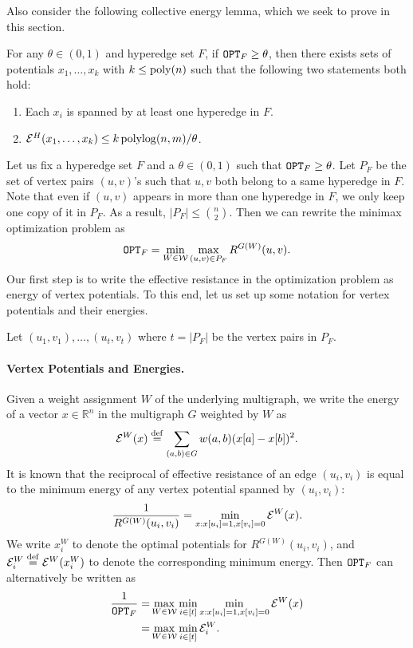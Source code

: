 \documentclass{article}
\begin{document}
Also consider the following collective energy lemma, which
we seek to prove in this section.


\begin{lemma}
    For any $\theta\in(0,1)$
    and hyperedge set $F$,
    if $\mathtt{OPT}_F \geq \theta$,
    then
    there exists sets of potentials $x_1,\ldots,x_k$
    with $k\leq\mathrm{poly}(n)$
    such that
    the following two statements both hold:
    \begin{enumerate}
        \item Each $x_i$ is spanned by at least one hyperedge in $F$.
        \item $\mathcal{E}^H(x_1,\ldots,x_k) \leq k \operatorname{polylog}(n,m) / \theta$.
    \end{enumerate}
\end{lemma}


Let us fix a hyperedge set $F$ and a $\theta\in(0,1)$ such that
$\mathtt{OPT}_F \geq \theta$.
Let $P_F$ be the set of vertex pairs $(u,v)$'s such that $u,v$ both belong to a same
hyperedge in $F$.
Note that even if $(u,v)$ appears in more than one hyperedge in $F$, we only keep one copy
of it in $P_F$. As a result, $|P_F|\leq \binom{n}{2}$.
Then we can rewrite the minimax optimization problem as
\begin{align}
    \mathtt{OPT}_F = \min_{W\in \mathcal{W}} \max_{(u,v)\in P_F} R^{G(W)}(u,v).
\end{align}
Our first step is to write the effective resistance in the optimization problem
as energy of vertex potentials.
To this end, let us set up some notation for vertex potentials and their energies.

Let $(u_1,v_1),\ldots,(u_{t},v_{t})$ where $t=|P_F|$ be the vertex pairs in $P_F$.

\paragraph{Vertex Potentials and Energies.}
Given a weight assignment $W$ of the underlying multigraph,
we write the energy of a vector $x\in\mathbb{R}^{n}$ in the multigraph
$G$ weighted by $W$ as
\begin{align}
    \mathcal{E}^W(x) \stackrel{\mathrm{def}}{=} 
    \sum_{(a,b)\in G} w(a,b) (x[a] - x[b])^2.
\end{align}
It is known that the reciprocal of effective resistance of an edge $(u_i,v_i)$ is equal
to the minimum energy of any vertex potential spanned by $(u_i,v_i)$:
\begin{align*}
    \frac{1}{R^{G(W)}(u_i,v_i)}
    = \min_{x: x[u_i]=1, x[v_i]=0} \mathcal{E}^W(x).
\end{align*}
We write $x_i^{W}$ to denote the optimal potentials for $R^{G(W)}(u_i,v_i)$,
and $\mathcal{E}_{i}^{W}\stackrel{\mathrm{def}}{=} \mathcal{E}^W(x_{i}^{W})$ to denote the corresponding minimum energy.
Then $\mathtt{OPT}_F$ can alternatively be written as
\begin{align}
    \frac{1}{\mathtt{OPT}_F} =
    & \max_{W\in\mathcal{W}} \min_{i\in [t]} \min_{x: x[u_i]=1, x[v_i]=0} \mathcal{E}^W(x) \notag \\ =
    & \max_{W\in\mathcal{W}} \min_{i\in[t]} \mathcal{E}^W_i. \label{eq:primal0}
\end{align}
\end{document}
